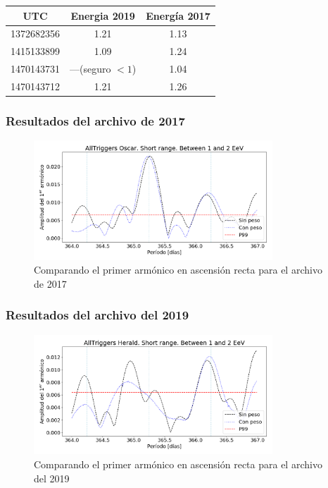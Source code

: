           \begin{table}[H]
          \centering
          
            \begin{tabular}{c| c| c}
            UTC     & Energia 2019 & Energía 2017\\ \hline
            1372682356  & 1.21       & 1.13     \\
            1415133899  & 1.09       & 1.24     \\
            1470143731  & ---(seguro $<1$) & 1.04     \\
            1470143712  & 1.21       & 1.26
            
            \end{tabular}
          \end{table}

      \subsubsection{Resultados del archivo de 2017}

          \begin{figure}[H]
            \centering
            \includegraphics[width=0.8\textwidth]{../0_Introduccion/AllTriggers/AllTriggers_2017_Short_range_Between_1_2_EeV.png}
            \caption{Comparando el primer armónico en ascensión recta para el archivo de 2017}
          \end{figure}

      \subsubsection{Resultados del archivo del 2019}

          \begin{figure}[H]
            \centering
            \includegraphics[width=0.8\textwidth]{../0_Introduccion/AllTriggers/AllTriggers_2019_Short_range_Between_1_2_EeV.png}
            \caption{Comparando el primer armónico en ascensión recta para el archivo del 2019}
          \end{figure}

